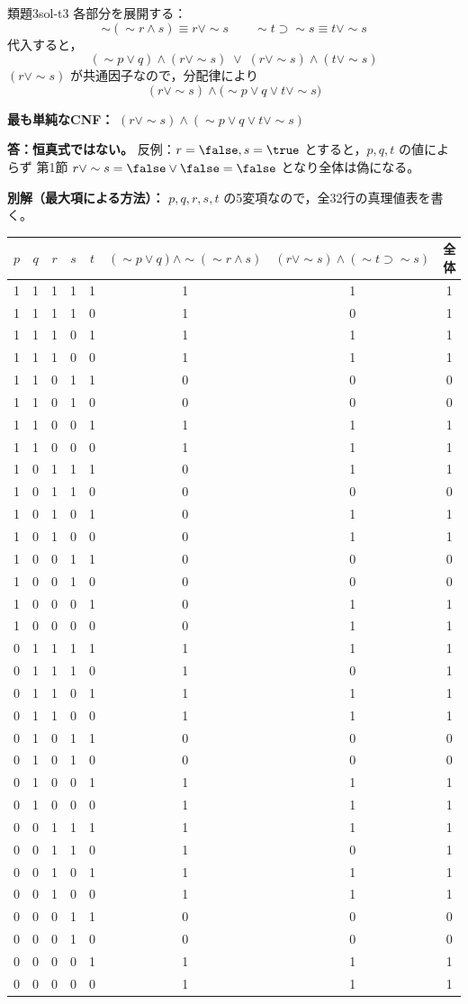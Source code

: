 \documentclass[autodetect-engine,dvi=dvipdfmx,ja=standard]{bxjsarticle}
\begin{document}
\begin{solution}{類題3}{sol-t3}
各部分を展開する：
\[
  \sim(\sim r\land s)\equiv r\lor\sim s
  \qquad
  \sim t\supset\sim s\equiv t\lor\sim s
\]
代入すると，
\[
  (\sim p\lor q)\land(r\lor\sim s)\;\lor\;(r\lor\sim s)\land(t\lor\sim s)
\]
\((r\lor\sim s)\) が共通因子なので，分配律により
\[
  (r\lor\sim s)\land\bigl(\sim p\lor q\lor t\lor\sim s\bigr)
\]

\textbf{最も単純なCNF：} \((r\lor\sim s)\land(\sim p\lor q\lor t\lor\sim s)\)

\textbf{答：恒真式ではない。} 反例：\(r=\false,s=\true\) とすると，\(p,q,t\) の値によらず
第1節 \(r\lor\sim s=\false\lor\false=\false\) となり全体は偽になる。

\textbf{別解（最大項による方法）：} \(p,q,r,s,t\) の5変項なので，全32行の真理値表を書く。

\begin{center}
\scriptsize
\begin{longtable}{ccccc|c|c|c}
\toprule
\(p\) & \(q\) & \(r\) & \(s\) & \(t\) & \((\sim p\lor q)\land\sim(\sim r\land s)\) & \((r\lor\sim s)\land(\sim t\supset\sim s)\) & 全体 \\
\midrule
\endhead
1&1&1&1&1&1&1&1\\
1&1&1&1&0&1&0&1\\
1&1&1&0&1&1&1&1\\
1&1&1&0&0&1&1&1\\
1&1&0&1&1&0&0&0\\
1&1&0&1&0&0&0&0\\
1&1&0&0&1&1&1&1\\
1&1&0&0&0&1&1&1\\
1&0&1&1&1&0&1&1\\
1&0&1&1&0&0&0&0\\
1&0&1&0&1&0&1&1\\
1&0&1&0&0&0&1&1\\
1&0&0&1&1&0&0&0\\
1&0&0&1&0&0&0&0\\
1&0&0&0&1&0&1&1\\
1&0&0&0&0&0&1&1\\
0&1&1&1&1&1&1&1\\
0&1&1&1&0&1&0&1\\
0&1&1&0&1&1&1&1\\
0&1&1&0&0&1&1&1\\
0&1&0&1&1&0&0&0\\
0&1&0&1&0&0&0&0\\
0&1&0&0&1&1&1&1\\
0&1&0&0&0&1&1&1\\
0&0&1&1&1&1&1&1\\
0&0&1&1&0&1&0&1\\
0&0&1&0&1&1&1&1\\
0&0&1&0&0&1&1&1\\
0&0&0&1&1&0&0&0\\
0&0&0&1&0&0&0&0\\
0&0&0&0&1&1&1&1\\
0&0&0&0&0&1&1&1\\
\bottomrule
\end{longtable}
\end{center}


\end{solution}
\end{document}
